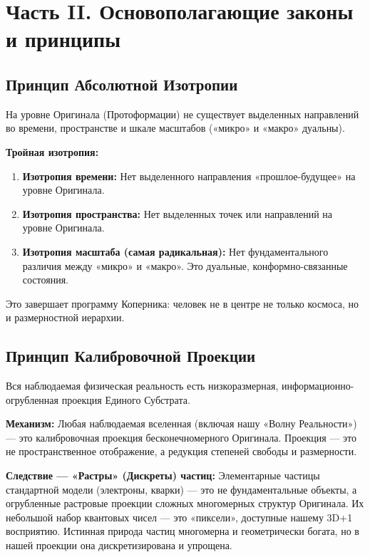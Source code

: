 \documentclass[a4paper,12pt]{article}
\begin{document}
\newpage
\section{Часть II. Основополагающие законы и принципы}

\subsection{Принцип Абсолютной Изотропии}

На уровне Оригинала (Протоформации) не существует выделенных направлений во времени, пространстве и шкале масштабов («микро» и «макро» дуальны).

\textbf{Тройная изотропия:}
\begin{enumerate}
	\item \textbf{Изотропия времени:} Нет выделенного направления «прошлое-будущее» на уровне Оригинала.
	\item \textbf{Изотропия пространства:} Нет выделенных точек или направлений на уровне Оригинала.
	\item \textbf{Изотропия масштаба (самая радикальная):} Нет фундаментального различия между «микро» и «макро». Это дуальные, конформно-связанные состояния.
\end{enumerate}

Это завершает программу Коперника: человек не в центре не только космоса, но и размерностной иерархии.

\subsection{Принцип Калибровочной Проекции}

Вся наблюдаемая физическая реальность есть низкоразмерная, информационно-огрубленная проекция Единого Субстрата.

\textbf{Механизм:} Любая наблюдаемая вселенная (включая нашу «Волну Реальности») — это калибровочная проекция бесконечномерного Оригинала. Проекция — это не пространственное отображение, а редукция степеней свободы и размерности.

\textbf{Следствие — «Растры» (Дискреты) частиц:} Элементарные частицы стандартной модели (электроны, кварки) — это не фундаментальные объекты, а огрубленные растровые проекции сложных многомерных структур Оригинала. Их небольшой набор квантовых чисел — это «пиксели», доступные нашему 3D+1 восприятию. Истинная природа частиц многомерна и геометрически богата, но в нашей проекции она дискретизирована и упрощена.
\end{document}

